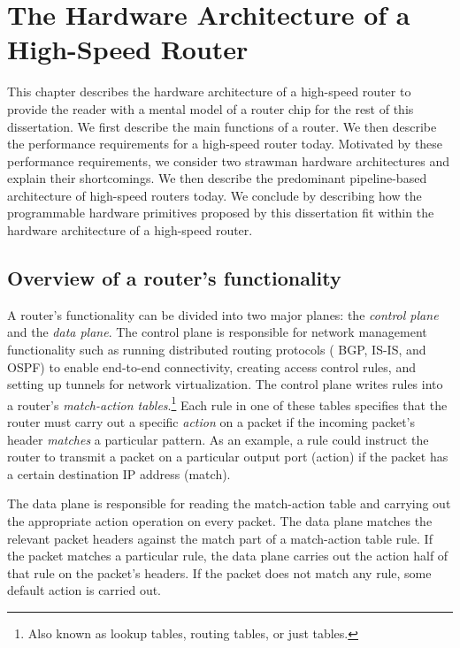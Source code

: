 \chapter{The Hardware Architecture of a High-Speed Router}
\label{chap:arch}

This chapter describes the hardware architecture of a high-speed router to
provide the reader with a mental model of a router chip for the rest of this
dissertation. We first describe the main functions of a router. We then
describe the performance requirements for a high-speed router today. Motivated
by these performance requirements, we consider two strawman hardware
architectures and explain their shortcomings. We then describe the predominant
pipeline-based architecture of high-speed routers today. We conclude by
describing how the programmable hardware primitives proposed by this
dissertation fit within the hardware architecture of a high-speed router.

\section{Overview of a router's functionality}

A router's functionality can be divided into two major planes: the {\em control
plane} and the {\em data plane}. The control plane is responsible for network
management functionality such as running distributed routing protocols (\eg
BGP, IS-IS, and OSPF) to enable end-to-end connectivity, creating access
control rules, and setting up tunnels for network virtualization. The control
plane writes rules into a router's {\em match-action tables}.\footnote{Also
known as lookup tables, routing tables, or just tables.} Each rule in one of
these tables specifies that the router must carry out a specific {\em action}
on a packet if the incoming packet's header {\em matches} a particular pattern.
As an example, a rule could instruct the router to transmit a packet on a
particular output port (action) if the packet has a certain destination IP address
(match).

The data plane is responsible for reading the match-action table and carrying
out the appropriate action operation on every packet.  The data plane matches
the relevant packet headers against the match part of a match-action table
rule. If the packet matches a particular rule, the data plane carries out the
action half of that rule on the packet's headers. If the packet does not match
any rule, some default action is carried out.


